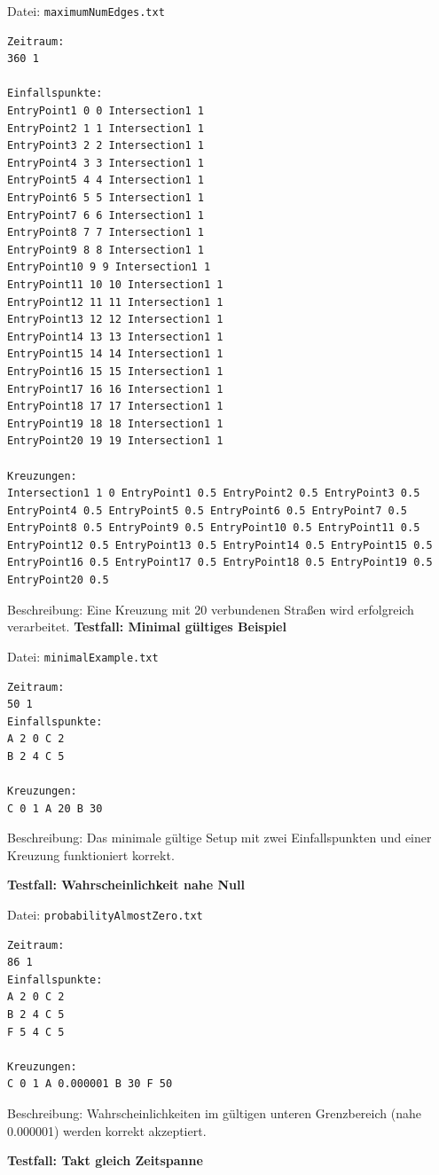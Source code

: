 Datei: \texttt{maximumNumEdges.txt}
\begin{lstlisting}
Zeitraum:
360 1

Einfallspunkte:
EntryPoint1 0 0 Intersection1 1
EntryPoint2 1 1 Intersection1 1
EntryPoint3 2 2 Intersection1 1
EntryPoint4 3 3 Intersection1 1
EntryPoint5 4 4 Intersection1 1
EntryPoint6 5 5 Intersection1 1
EntryPoint7 6 6 Intersection1 1
EntryPoint8 7 7 Intersection1 1
EntryPoint9 8 8 Intersection1 1
EntryPoint10 9 9 Intersection1 1
EntryPoint11 10 10 Intersection1 1
EntryPoint12 11 11 Intersection1 1
EntryPoint13 12 12 Intersection1 1
EntryPoint14 13 13 Intersection1 1
EntryPoint15 14 14 Intersection1 1
EntryPoint16 15 15 Intersection1 1
EntryPoint17 16 16 Intersection1 1
EntryPoint18 17 17 Intersection1 1
EntryPoint19 18 18 Intersection1 1
EntryPoint20 19 19 Intersection1 1

Kreuzungen:
Intersection1 1 0 EntryPoint1 0.5 EntryPoint2 0.5 EntryPoint3 0.5 EntryPoint4 0.5 EntryPoint5 0.5 EntryPoint6 0.5 EntryPoint7 0.5 EntryPoint8 0.5 EntryPoint9 0.5 EntryPoint10 0.5 EntryPoint11 0.5 EntryPoint12 0.5 EntryPoint13 0.5 EntryPoint14 0.5 EntryPoint15 0.5 EntryPoint16 0.5 EntryPoint17 0.5 EntryPoint18 0.5 EntryPoint19 0.5 EntryPoint20 0.5
\end{lstlisting}

Beschreibung: Eine Kreuzung mit 20 verbundenen Straßen wird erfolgreich verarbeitet.
\clearpage
\textbf{Testfall: Minimal gültiges Beispiel}

Datei: \texttt{minimalExample.txt}
\begin{lstlisting}
Zeitraum:
50 1
Einfallspunkte:
A 2 0 C 2
B 2 4 C 5

Kreuzungen:
C 0 1 A 20 B 30
\end{lstlisting}

Beschreibung: Das minimale gültige Setup mit zwei Einfallspunkten und einer Kreuzung funktioniert korrekt.

\textbf{Testfall: Wahrscheinlichkeit nahe Null}

Datei: \texttt{probabilityAlmostZero.txt}
\begin{lstlisting}
Zeitraum:
86 1
Einfallspunkte:
A 2 0 C 2
B 2 4 C 5
F 5 4 C 5

Kreuzungen:
C 0 1 A 0.000001 B 30 F 50
\end{lstlisting}

Beschreibung: Wahrscheinlichkeiten im gültigen unteren Grenzbereich (nahe 0.000001) werden korrekt akzeptiert.

\textbf{Testfall: Takt gleich Zeitspanne}


